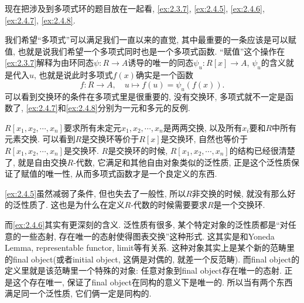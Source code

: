 \begin{remark}
    现在把涉及到多项式环的题目放在一起看, \ref{ex:2.3.7}, \ref{ex:2.4.5}, \ref{ex:2.4.6}, \ref{ex:2.4.7}, \ref{ex:2.4.8}.
    
    我们希望“多项式”可以满足我们一直以来的直觉, 其中最重要的一条应该是可以赋值, 也就是说我们希望一个多项式同时也是一个多项式函数. “赋值”这个操作在\ref{ex:2.3.7}解释为由环同态$\psi:R \to A$诱导的唯一的同态$\psi_u:R[x] \to A$, $\psi_u$的含义就是代入$u$, 也就是说此时多项式$f(x)$确实是一个函数
    \[
        f:R \to A,\quad u \mapsto f(u) = \psi_u(f(x)).
    \]
    可以看到交换环的条件在多项式里是很重要的, 没有交换环, 多项式就不一定是函数了, \ref{ex:2.4.7}和\ref{ex:2.4.8}分别为一元和多元的反例.
    
    $R[x_1, x_2, \cdots, x_n]$要求所有未定元$x_1, x_2, \cdots, x_n$是两两交换, 以及所有$x_i$要和$R$中所有元素交换. 可以看到$R$是交换环等价于$R[x]$是交换环, 自然也等价于$R[x_1, x_2, \cdots, x_n]$是交换环. $R$是交换环的时候, $R[x_1, x_2, \cdots, x_n]$的结构已经很清楚了, 就是自由交换$R$-代数, 它满足和其他自由对象类似的泛性质, 正是这个泛性质保证了赋值的唯一性, 从而多项式函数才是一个良定义的东西.

    \ref{ex:2.4.5}虽然减弱了条件, 但也失去了一般性, 所以$R$非交换的时候, 就没有那么好的泛性质了. 这也是为什么在定义$R$-代数的时候需要要求$R$是一个交换环.

    而\ref{ex:2.4.6}其实有更深刻的含义. 泛性质有很多, 某个特定对象的泛性质都是“对任意的一些态射, 存在唯一的态射使得图表交换”这种形式. 这其实是和Yoneda Lemma, representable functor, limit等有关系. 这种对象其实上是某个新的范畴里的final object(或者initial object, 这俩是对偶的, 就差一个反范畴). 而final object的定义里就是该范畴里一个特殊的对象: 任意对象到final object存在唯一的态射. 正是这个存在唯一, 保证了final object在同构的意义下是唯一的. 所以当有两个东西满足同一个泛性质, 它们俩一定是同构的.
\end{remark}